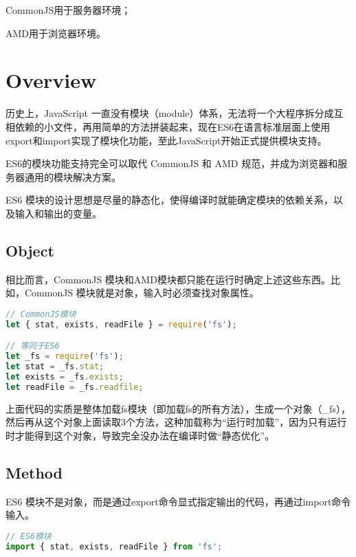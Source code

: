 \begin{compactitem}
\item CommonJS用于服务器环境；
\item AMD用于浏览器环境。
\end{compactitem}

\section{Overview}


历史上，JavaScript 一直没有模块（module）体系，无法将一个大程序拆分成互相依赖的小文件，再用简单的方法拼装起来，现在ES6在语言标准层面上使用export和import实现了模块化功能，至此JavaScript开始正式提供模块支持。

ES6的模块功能支持完全可以取代 CommonJS 和 AMD 规范，并成为浏览器和服务器通用的模块解决方案。

ES6 模块的设计思想是尽量的静态化，使得编译时就能确定模块的依赖关系，以及输入和输出的变量。

\subsection{Object}


相比而言，CommonJS 模块和AMD模块都只能在运行时确定上述这些东西。比如，CommonJS 模块就是对象，输入时必须查找对象属性。


\begin{lstlisting}[language=JavaScript]
// CommonJS模块
let { stat, exists, readFile } = require('fs');

// 等同于ES6
let _fs = require('fs');
let stat = _fs.stat;
let exists = _fs.exists;
let readFile = _fs.readfile;
\end{lstlisting}

上面代码的实质是整体加载fs模块（即加载fs的所有方法），生成一个对象（\_fs），然后再从这个对象上面读取3个方法，这种加载称为“运行时加载”，因为只有运行时才能得到这个对象，导致完全没办法在编译时做“静态优化”。

\subsection{Method}


ES6 模块不是对象，而是通过export命令显式指定输出的代码，再通过import命令输入。




\begin{lstlisting}[language=JavaScript]
// ES6模块
import { stat, exists, readFile } from 'fs';
\end{lstlisting}

